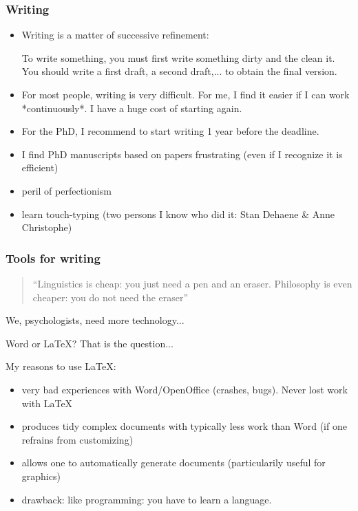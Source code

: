 \documentclass{beamer}
\begin{document}
\begin{frame}[<+->]
\frametitle{Writing}

\begin{itemize}

\item Writing is a matter of successive refinement:

To write something, you must first write something dirty and the clean it.
You should write a first draft, a second draft,... to obtain the final version.

\item For most people, writing is very difficult. For me, I find it easier if I can work *continuously*. I have a huge cost of starting again.

\item For the PhD, I recommend to start writing 1 year before the deadline.

\item I find PhD manuscripts based on papers frustrating (even if I recognize it is efficient)

\item peril of perfectionism

\item learn touch-typing (two persons I know who did it: Stan Dehaene \& Anne Christophe) 

\end{itemize}  

\end{frame}


\begin{frame}[<+->]
\frametitle{Tools for writing}

\begin{quote}
``Linguistics is cheap: you just need a pen and an eraser. Philosophy is even cheaper: you do not need the eraser''
\end{quote}

We, psychologists, need more technology...

Word or \LaTeX{}? That is the question...

My reasons to use \LaTeX{}:

\begin{itemize}
\item  very bad experiences with Word/OpenOffice (crashes, bugs). Never lost work with LaTeX

\item  produces tidy complex documents with typically less work than Word (if one refrains from customizing)

\item  allows one to automatically generate documents (particularily useful for graphics)

\item drawback: like programming: you have to learn a language.
\end{itemize}
\end{frame}
\end{document}
